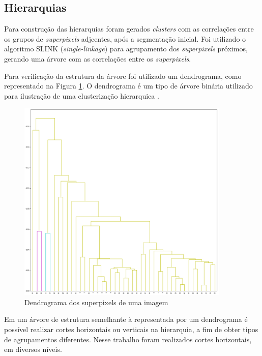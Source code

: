\begin{document}
\subsection{Hierarquias} \label{ssec:hierquia_segm}


Para construção das hierarquias foram gerados \textit{clusters} com as correlações entre os grupos de \textit{superpixels} adjcentes, após a segmentação inicial. Foi utilizado o algoritmo SLINK (\textit{single-linkage}) para agrupamento dos \textit{superpixels} próximos, gerando uma árvore com as correlações entre os \textit{superpixels}.

Para verificação da estrutura da árvore foi utilizado um dendrograma, como representado na Figura \ref{fig:DENDROGRAM}. O dendrograma é um tipo de árvore binária utilizado para ilustração de uma clusterização hierarquica \cite{SINGLE_LINKAGE}.

\begin{figure}[ht]
\centering
\includegraphics[width=0.9\textwidth]{dendrogram.png}
\caption{Dendrograma dos superpixels de uma imagem}
\label{fig:DENDROGRAM}
\end{figure}

Em um árvore de estrutura semelhante à representada por um dendrograma é possível realizar cortes horizontais ou verticais na hierarquia, a fim de obter tipos de agrupamentos diferentes. Nesse trabalho foram realizados cortes horizontais, em diversos níveis. 
\end{document}
